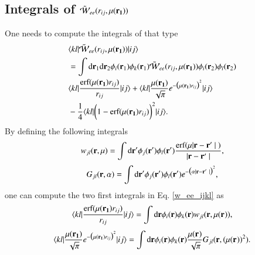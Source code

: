 \documentclass[aip,jcp,reprint,noshowkeys,superscriptaddress]{revtex4-1}
\newcommand{\matelem}[3]{\langle #1 | #2 | #3 \rangle}
\newcommand{\br}[0]{{\bf {r}}}
\newcommand{\mur}[1]{\mu({\bf r_{#1}})}
\begin{document}
\subsection{Integrals of $\tilde{\mathcal{W}}_{ee}(r_{ij},\mur{1})$ }
One needs to compute the integrals of that type
\begin{equation}
 \label{w_ee_ijkl}
 \begin{aligned}
 &\matelem{kl}{\tilde{\mathcal{W}}_{ee}(r_{ij},\mur{1})}{ij} \\ & = \int \text{d}\br_{1} \text{d}\br_{2} \phi_i(\br_1) \phi_k(\br_1) \tilde{\mathcal{W}}_{ee}(r_{ij},\mur{1}) \phi_i(\br_2) \phi_l(\br_2) \\
 &\matelem{kl}{\frac{\text{erf}(\mur{1} r_{ij})}{r_{ij}}}{ij} 
 + \matelem{kl}{\frac{\mur{1}}{\sqrt{\pi}} e^{-\big(\mur{1} r_{ij} \big)^2}}{ij} \\ 
& - \frac{1}{4}\matelem{kl}{\bigg(1 -  \text{erf}(\mur{1} r_{ij}) \bigg)^2}{ij}.
 \end{aligned}
\end{equation}
By defining the following integrals
\begin{equation}
 w_{jl}(\br,\mu) = \int \text{d}\br' \phi_j(\br') \phi_l(\br') \frac{\text{erf}(\mu |\br - \br' | )}{ |\br - \br' |},
\end{equation}
\begin{equation}
 G_{jl}(\br,\alpha) = \int \text{d}\br' \phi_j(\br') \phi_l(\br') e^{-\big(\alpha |\br - \br' |\big)^2 } ,
\end{equation}
one can compute the two first integrals in Eq. \eqref{w_ee_ijkl} as 
\begin{equation}
 \matelem{kl}{\frac{\text{erf}(\mur{1} r_{ij})}{r_{ij}}}{ij} = \int \text{d}\br \phi_i(\br) \phi_k(\br) w_{jl}(\br,\mur{}), 
\end{equation}
\begin{equation}
 \matelem{kl}{\frac{\mur{1}}{\sqrt{\pi}} e^{-\big(\mur{1} r_{ij} \big)^2}}{ij} = \int \text{d}\br \phi_i(\br) \phi_k(\br)\frac{\mur{}}{\sqrt{\pi}} G_{jl}(\br,(\mur{})^2). 
\end{equation}
\end{document}
